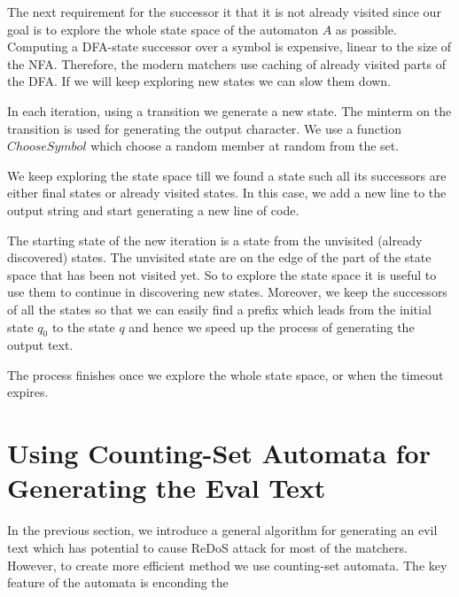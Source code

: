 \documentclass[acmsmall,screen]{acmart}
\begin{document}
%
The next requirement for the successor it that it is not already visited since our goal is 
%
to explore the whole state space of the automaton $A$ as possible.
%
Computing a DFA-state successor over a symbol is expensive, linear to the size of the NFA.
%
Therefore, the modern matchers use caching of already visited parts of the DFA. 
%
If we will keep exploring new states we can slow them down.

%
In each iteration, using a transition we generate a new state.
%
The minterm on the transition is used for generating the output character. 
%
We use a function $ChooseSymbol$ which choose a random member at random from the set.
%

We keep exploring the state space till we found a state such all its successors are either final states or already visited states.
%
In this case, we add a new line to the output string and start generating a new line of code.
%

The starting state of the new iteration is a state from the unvisited (already discovered) states. 
%
The unvisited state are on the edge of the part of the state space that has been not visited yet. 
%
So to explore the state space it is useful to use them to continue in discovering new states.
%
Moreover, we keep the successors of all the states so that we can easily find a prefix
%
which leads from the initial state $q_0$ to the state $q$ 
%
and hence we speed up the process of generating the output text.

The process finishes once we explore the whole state space, or when the timeout expires.
  



\section{Using Counting-Set Automata for Generating the Eval Text}\label{sec:genText}
In the previous section, we introduce a general algorithm for generating an evil text which has potential to cause ReDoS attack for most of the matchers. 
%
However, to create more efficient method we use counting-set automata.
%
The key feature of the automata is enconding the 
\end{document}
